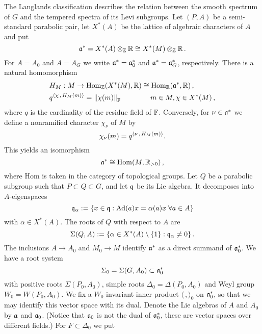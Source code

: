 The Langlands classification describes the relation between the
smooth spectrum of $G$ and the tempered spectra of its Levi subgroups.
Let $(P,A)$ be a semi-standard parabolic pair, let $X^* (A)$ be the lattice of 
algebraic characters of $A$ and put 
\[
\mathfrak a^* = X^* (A) \otimes_{\mathbb Z} \mathbb R \cong X^* (M) \otimes_{\mathbb Z} \mathbb R \,.
\]
For $A = A_0$ and $A = A_G$ we write $\mathfrak a^* = \mathfrak a_0^*$ and 
$\mathfrak a^* = \mathfrak a_G^*$, respectively. There is a natural homomorphism
\begin{equation}
\begin{split}
& H_M : M \to \mathrm{Hom}_{\mathbb Z} (X^* (M), \mathbb R) \cong
  \mathrm{Hom}_{\mathbb R} (\mathfrak a^* ,\mathbb R ) \,, \\
& q^{\langle \chi \,,\, H_M (m) \rangle} = \left\| \chi (m) \right\|_{\mathbb F} 
\qquad \qquad m \in M , \chi \in X^* (M) \,,
\end{split}
\end{equation}
where $q$ is the cardinality of the residue field of $\mathbb F$. Conversely, for 
$\nu \in \mathfrak a^*$ we define a nonramified character $\chi_\nu$ of $M$ by
\begin{equation}
\chi_\nu (m) = q^{\langle \nu \,,\, H_M (m) \rangle} .
\end{equation}
This yields an isomorphism 
\[
\mathfrak a^* \cong \mathrm{Hom}(M, \mathbb R_{>0}) \,,
\]
where Hom is taken in the category of topological groups.
Let $Q$ be a parabolic subgroup such that $P \subset Q \subset G$,
and let $\mathfrak q$ be its Lie algebra. It decomposes into $A$-eigenspaces
\begin{equation}
\mathfrak q_\alpha := \{ x \in \mathfrak q : \mathrm{Ad}(a) x = \alpha (a) x \;
\forall a \in A \}
\end{equation}
with $\alpha \in X^* (A)$. The roots of $Q$ with respect to $A$ are
\begin{equation}
\Sigma (Q,A) := \{ \alpha \in X^* (A) \setminus \{ 1 \} : \mathfrak
q_\alpha \neq 0 \} \,.
\end{equation}
The inclusions $A \to A_0$ and $M_0 \to M$ identify $\mathfrak a^*$ as a direct 
summand of $\mathfrak a_0^*$. We have a root system
\[
\Sigma_0 = \Sigma (G,A_0 ) \subset \mathfrak a_0^*
\]
with positive roots $\Sigma (P_0 ,A_0 )$, simple roots $\Delta_0 = \Delta(P_0, A_0)$ 
and Weyl group $W_0 = W (P_0 ,A_0 )$. 
We fix a $W_0$-invariant inner product $\langle \,, \rangle_0$ 
on $\mathfrak a_0^*$, so that we may identify this vector space with its dual. 
Denote the Lie algebras of $A$ and $A_0$ by $\mathfrak a$ and $\mathfrak a_0$. 
(Notice that $\mathfrak a_0$ is not the dual of $\mathfrak a_0^* $, these are vector 
spaces over different fields.) For $F \subset \Delta_0$ we put

